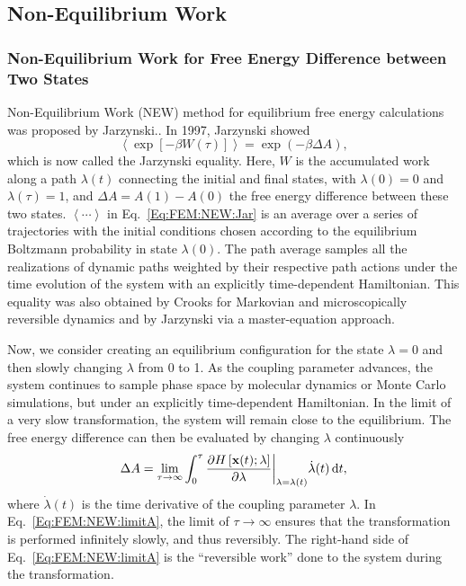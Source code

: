 \subsection{Non-Equilibrium Work\label{Sec:FEM:NEW}}
\subsubsection{Non-Equilibrium Work for Free Energy Difference between Two States\label{Sec:FEM:NEW:StateFE}}
Non-Equilibrium Work (NEW) method for equilibrium free energy calculations was proposed by Jarzynski.\cite{JarzynskiPRL1997}. 
In 1997, Jarzynski showed
\begin{equation}
    \left< \exp\left[-\beta W(\tau)\right] \right> = \exp{(-\beta \Delta A)},
    \label{Eq:FEM:NEW:Jar}
\end{equation}
which is now called the Jarzynski equality. Here, $W$ is the accumulated work along a path $\lambda(t)$ connecting the initial and final states, with $\lambda(0)=0$ and $\lambda(\tau)=1$, and $\Delta A = A(1) - A(0)$ the free energy difference between these two states. 
$\left \langle \cdots \right \rangle$ in Eq.~\ref{Eq:FEM:NEW:Jar} is an average over a series of trajectories with the initial conditions chosen according to the equilibrium Boltzmann probability in state $\lambda(0)$. The path average samples all the realizations of dynamic paths weighted by their respective path actions under the time evolution of the system with an explicitly time-dependent Hamiltonian. This equality was also obtained by Crooks for Markovian and microscopically reversible dynamics\cite{CrooksJSP1998} and by Jarzynski via a master-equation approach\cite{JarzynskiPRE1997}. 

Now, we consider creating an equilibrium configuration for the state $\lambda=0$ and then slowly changing $\lambda$ from 0 to 1. As the coupling parameter advances, the system continues to sample phase space by molecular dynamics or Monte Carlo simulations, but under an explicitly time-dependent Hamiltonian. In the limit of a very slow transformation, the system will remain close to the equilibrium. The free energy difference can then be evaluated by changing $\lambda$ continuously
\begin{equation}
    \Delta A =\lim_{\tau\to\infty} \int_{0}^{\tau} {\frac{\partial{H\left[\textbf{x}(t);\lambda\right]}}{\partial{\lambda}}\bigg\rvert}_{\lambda=\lambda(t)} \dot{\lambda}(t) \mathop{}\!\mathrm{d} t,
    \label{Eq:FEM:NEW:limitA}
\end{equation}  
where $\dot{\lambda}(t)$ is the time derivative of the coupling parameter $\lambda$. In Eq.~\ref{Eq:FEM:NEW:limitA}, the limit of $\tau\to\infty$ ensures that the transformation is performed infinitely slowly, and thus reversibly. The right-hand side of Eq.~\ref{Eq:FEM:NEW:limitA} is the ``reversible work'' done to the system during the transformation.

